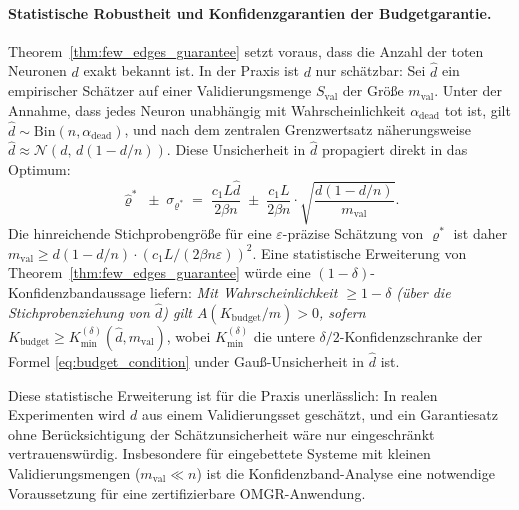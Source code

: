 ﻿\documentclass[12pt, a4paper, openany]{report}
\newcommand{\eps}{\varepsilon}
\begin{document}
\paragraph{Statistische Robustheit und Konfidenzgarantien der Budgetgarantie.}
Theorem~\ref{thm:few_edges_guarantee} setzt voraus, dass die Anzahl der
toten Neuronen $d$ exakt bekannt ist.  In der Praxis ist $d$ nur
schätzbar: Sei $\hat{d}$ ein empirischer Schätzer auf einer
Validierungsmenge $S_{\mathrm{val}}$ der Größe $m_{\mathrm{val}}$.  Unter
der Annahme, dass jedes Neuron unabhängig mit Wahrscheinlichkeit
$\alpha_{\mathrm{dead}}$ tot ist, gilt
$\hat{d} \sim \mathrm{Bin}(n, \alpha_{\mathrm{dead}})$, und nach dem
zentralen Grenzwertsatz näherungsweise
$\hat{d} \approx \mathcal{N}(d,\,d(1 - d/n))$.  Diese Unsicherheit in
$\hat{d}$ propagiert direkt in das Optimum:
\[
  \hat\varrho^* \;\pm\; \sigma_{\varrho^*}
  \;=\; \frac{c_1 L \hat{d}}{2\beta n}
  \;\pm\; \frac{c_1 L}{2\beta n}
  \cdot\sqrt{\frac{d(1-d/n)}{m_{\mathrm{val}}}}.
\]
Die hinreichende Stichprobengröße für eine $\eps$-präzise Schätzung von
$\varrho^*$ ist daher
$m_{\mathrm{val}} \geq d(1-d/n) \cdot (c_1 L / (2\beta n \eps))^2$.  Eine
statistische Erweiterung von Theorem~\ref{thm:few_edges_guarantee} würde
eine $(1-\delta)$-Konfidenzbandaussage liefern: \emph{Mit Wahrscheinlichkeit
$\geq 1-\delta$ (über die Stichprobenziehung von $\hat{d}$) gilt
$A(K_{\mathrm{budget}}/m) > 0$, sofern}
$K_{\mathrm{budget}} \geq K^{(\delta)}_{\mathrm{min}}(\hat{d}, m_{\mathrm{val}})$,
wobei $K^{(\delta)}_{\mathrm{min}}$ die untere $\delta/2$-Konfidenzschranke
der Formel \eqref{eq:budget_condition} under Gauß-Unsicherheit in $\hat{d}$ ist.

Diese statistische Erweiterung ist für die Praxis unerlässlich: In realen
Experimenten wird $d$ aus einem Validierungsset geschätzt, und ein Garantie\-satz
ohne Berücksichtigung der Schätzunsicherheit wäre nur eingeschränkt
vertrauenswürdig.  Insbesondere für eingebettete Systeme mit kleinen
Validierungsmengen ($m_{\mathrm{val}} \ll n$) ist die Konfidenz\-band-Analyse
eine notwendige Voraussetzung für eine zertifizierbare OMGR-Anwendung.
\end{document}
